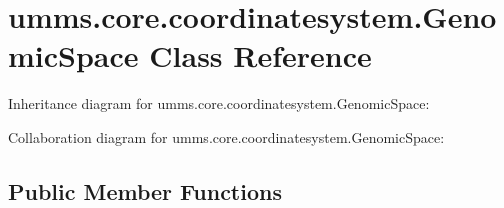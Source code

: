 \hypertarget{classumms_1_1core_1_1coordinatesystem_1_1_genomic_space}{\section{umms.\+core.\+coordinatesystem.\+Genomic\+Space Class Reference}
\label{classumms_1_1core_1_1coordinatesystem_1_1_genomic_space}
}


Inheritance diagram for umms.\+core.\+coordinatesystem.\+Genomic\+Space\+:


Collaboration diagram for umms.\+core.\+coordinatesystem.\+Genomic\+Space\+:
\subsection*{Public Member Functions}
